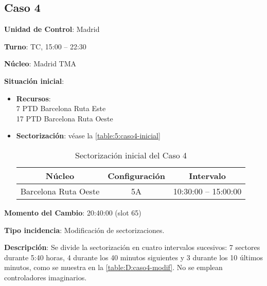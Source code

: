 \subsection{Caso 4}

\textbf{Unidad de Control}: Madrid

\textbf{Turno}: TC, 15:00 -- 22:30

\textbf{Núcleo}: Madrid TMA

\textbf{Situación inicial}:
\begin{itemize}[label={}]
	
	\item \textbf{Recursos}: \\
	7 PTD Barcelona Ruta Este \\
	17 PTD Barcelona Ruta Oeste
	
	
	\item \textbf{Sectorización}: véase la \autoref{table:5:caso4-inicial}
	\begin{table}[h]
		\centering
		\caption{Sectorización inicial del Caso 4}
		\label{table:5:caso4-inicial}
		\begin{tabular}{ccc}
			\hline
			\textbf{Núcleo} & \textbf{Configuración} & \textbf{Intervalo} \\ \hline
			Barcelona Ruta Oeste             & 5A                                      & 10:30:00 -- 15:00:00                \\ \hline
		\end{tabular}
	\end{table}
\end{itemize}

\textbf{Momento del Cambio}: 20:40:00  (slot 65)

\textbf{Tipo incidencia}: Modificación de sectorizaciones.

\textbf{Descripción}: Se divide la sectorización en cuatro intervalos sucesivos: 7 sectores durante 5:40 horas, 4 durante los 40 minutos siguientes y 3 durante los 10 últimos minutos, como se muestra en la \autoref{table:D:caso4-modif}. No se emplean controladores imaginarios.

